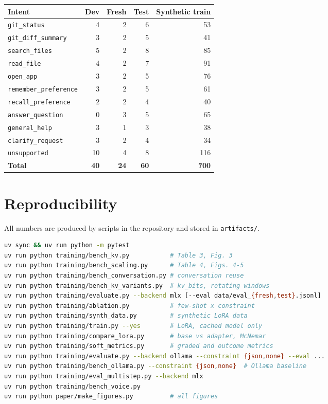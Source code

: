 \documentclass[10pt,twocolumn,letterpaper]{article}
\theoremstyle{definition}
\begin{document}
\begin{center}\small
\begin{tabular}{@{}lrrrr@{}}
\toprule
Intent & Dev & Fresh & Test & Synthetic train \\
\midrule
\texttt{git\_status} & 4 & 2 & 6 & 53 \\
\texttt{git\_diff\_summary} & 3 & 2 & 5 & 41 \\
\texttt{search\_files} & 5 & 2 & 8 & 85 \\
\texttt{read\_file} & 4 & 2 & 7 & 91 \\
\texttt{open\_app} & 3 & 2 & 5 & 76 \\
\texttt{remember\_preference} & 3 & 2 & 5 & 61 \\
\texttt{recall\_preference} & 2 & 2 & 4 & 40 \\
\texttt{answer\_question} & 0 & 3 & 5 & 65 \\
\texttt{general\_help} & 3 & 1 & 3 & 38 \\
\texttt{clarify\_request} & 3 & 2 & 4 & 34 \\
\texttt{unsupported} & 10 & 4 & 8 & 116 \\
\midrule
\textbf{Total} & \textbf{40} & \textbf{24} & \textbf{60} & \textbf{700} \\
\bottomrule
\end{tabular}
\end{center}

\section{Reproducibility}\label{app:repro}\label{sec:repro}
All numbers are produced by scripts in the repository and stored in \texttt{artifacts/}.
\begin{lstlisting}[language=bash,numbers=none,basicstyle=\ttfamily\scriptsize]
uv sync && uv run python -m pytest
uv run python training/bench_kv.py           # Table 3, Fig. 3
uv run python training/bench_scaling.py      # Table 4, Figs. 4-5
uv run python training/bench_conversation.py # conversation reuse
uv run python training/bench_kv_variants.py  # kv_bits, rotating windows
uv run python training/evaluate.py --backend mlx [--eval data/eval_{fresh,test}.jsonl]
uv run python training/ablation.py           # few-shot x constraint
uv run python training/synth_data.py         # synthetic LoRA data
uv run python training/train.py --yes        # LoRA, cached model only
uv run python training/compare_lora.py       # base vs adapter, McNemar
uv run python training/soft_metrics.py       # graded and outcome metrics
uv run python training/evaluate.py --backend ollama --constraint {json,none} --eval ...
uv run python training/bench_ollama.py --constraint {json,none}  # Ollama baseline
uv run python training/eval_multistep.py --backend mlx
uv run python training/bench_voice.py
uv run python paper/make_figures.py          # all figures
\end{lstlisting}
\end{document}
